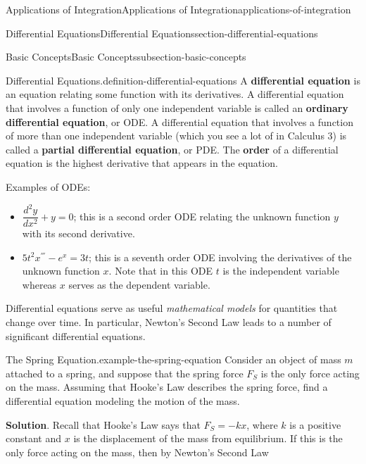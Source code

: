 \documentclass[oneside,10pt,]{book}
\newcommand{\terminology}[1]{\textbf{#1}}
\numberwithin{equation}{section}
\newcommand{\dv}[3][]{\dfrac{d^{#1} #2}{d #3^{#1}}}
\begin{document}
\begin{chapterptx}{Applications of Integration}{}{Applications of Integration}{}{}{applications-of-integration}
\begin{sectionptx}{Differential Equations}{}{Differential Equations}{}{}{section-differential-equations}
%
%
\typeout{************************************************}
\typeout{************************************************}
%
\begin{subsectionptx}{Basic Concepts}{}{Basic Concepts}{}{}{subsection-basic-concepts}
\begin{definition}{Differential Equations.}{definition-differential-equations}%
\hypertarget{p-715}{}%
A \terminology{differential equation} is an equation relating some function with its derivatives. A differential equation that involves a function of only one independent variable is called an \terminology{ordinary differential equation}, or ODE. A differential equation that involves a function of more than one independent variable (which you see a lot of in Calculus 3) is called a \terminology{partial differential equation}, or PDE. The \terminology{order} of a differential equation is the highest derivative that appears in the equation.%
\end{definition}
\hypertarget{p-716}{}%
Examples of ODEs:\leavevmode%
\begin{itemize}[label=\textbullet]
\item{}\hypertarget{p-717}{}%
\(\dv[2]{y}{x} + y = 0\); this is a second order ODE relating the unknown function \(y\) with its second derivative.%
\item{}\hypertarget{p-718}{}%
\(5t^{2}x^{'''} - e^{x} = 3t\); this is a seventh order ODE involving the derivatives of the unknown function \(x\). Note that in this ODE \(t\) is the independent variable whereas \(x\) serves as the dependent variable.%
\end{itemize}
%
\par
\hypertarget{p-719}{}%
Differential equations serve as useful \emph{mathematical models} for quantities that change over time. In particular, Newton's Second Law leads to a number of significant differential equations.%
\begin{example}{The Spring Equation.}{example-the-spring-equation}%
\hypertarget{p-720}{}%
Consider an object of mass \(m\) attached to a spring, and suppose that the spring force \(F_{S}\) is the only force acting on the mass. Assuming that Hooke's Law describes the spring force, find a differential equation modeling the motion of the mass.%
\par\smallskip%
\noindent\textbf{Solution}.\hypertarget{solution-152}{}\quad%
\hypertarget{p-721}{}%
Recall that Hooke's Law says that \(F_{S} = -kx\), where \(k\) is a positive constant and \(x\) is the displacement of the mass from equilibrium. If this is the only force acting on the mass, then by Newton's Second Law%

\end{example}
\end{subsectionptx}
\end{sectionptx}
\end{chapterptx}
\end{document}
